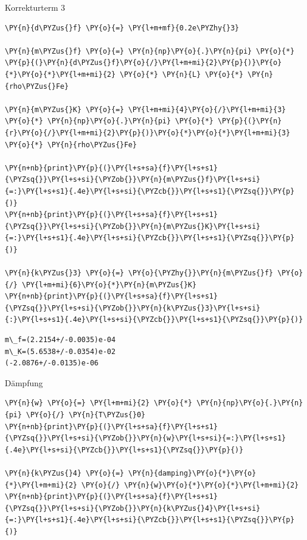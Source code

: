     Korrekturterm 3

    \begin{tcolorbox}[breakable, size=fbox, boxrule=1pt, pad at break*=1mm,colback=cellbackground, colframe=cellborder]
\begin{Verbatim}[commandchars=\\\{\}]
\PY{n}{d\PYZus{}f} \PY{o}{=} \PY{l+m+mf}{0.2e\PYZhy{}3}

\PY{n}{m\PYZus{}f} \PY{o}{=} \PY{n}{np}\PY{o}{.}\PY{n}{pi} \PY{o}{*} \PY{p}{(}\PY{n}{d\PYZus{}f}\PY{o}{/}\PY{l+m+mi}{2}\PY{p}{)}\PY{o}{*}\PY{o}{*}\PY{l+m+mi}{2} \PY{o}{*} \PY{n}{L} \PY{o}{*} \PY{n}{rho\PYZus{}Fe}

\PY{n}{m\PYZus{}K} \PY{o}{=} \PY{l+m+mi}{4}\PY{o}{/}\PY{l+m+mi}{3} \PY{o}{*} \PY{n}{np}\PY{o}{.}\PY{n}{pi} \PY{o}{*} \PY{p}{(}\PY{n}{r}\PY{o}{/}\PY{l+m+mi}{2}\PY{p}{)}\PY{o}{*}\PY{o}{*}\PY{l+m+mi}{3} \PY{o}{*} \PY{n}{rho\PYZus{}Fe}

\PY{n+nb}{print}\PY{p}{(}\PY{l+s+sa}{f}\PY{l+s+s1}{\PYZsq{}}\PY{l+s+si}{\PYZob{}}\PY{n}{m\PYZus{}f}\PY{l+s+si}{=:}\PY{l+s+s1}{.4e}\PY{l+s+si}{\PYZcb{}}\PY{l+s+s1}{\PYZsq{}}\PY{p}{)}
\PY{n+nb}{print}\PY{p}{(}\PY{l+s+sa}{f}\PY{l+s+s1}{\PYZsq{}}\PY{l+s+si}{\PYZob{}}\PY{n}{m\PYZus{}K}\PY{l+s+si}{=:}\PY{l+s+s1}{.4e}\PY{l+s+si}{\PYZcb{}}\PY{l+s+s1}{\PYZsq{}}\PY{p}{)}

\PY{n}{k\PYZus{}3} \PY{o}{=} \PY{o}{\PYZhy{}}\PY{n}{m\PYZus{}f} \PY{o}{/} \PY{l+m+mi}{6}\PY{o}{*}\PY{n}{m\PYZus{}K}
\PY{n+nb}{print}\PY{p}{(}\PY{l+s+sa}{f}\PY{l+s+s1}{\PYZsq{}}\PY{l+s+si}{\PYZob{}}\PY{n}{k\PYZus{}3}\PY{l+s+si}{:}\PY{l+s+s1}{.4e}\PY{l+s+si}{\PYZcb{}}\PY{l+s+s1}{\PYZsq{}}\PY{p}{)}
\end{Verbatim}
\end{tcolorbox}

    \begin{Verbatim}[commandchars=\\\{\}]
m\_f=(2.2154+/-0.0035)e-04
m\_K=(5.6538+/-0.0354)e-02
(-2.0876+/-0.0135)e-06
    \end{Verbatim}

    Dämpfung

    \begin{tcolorbox}[breakable, size=fbox, boxrule=1pt, pad at break*=1mm,colback=cellbackground, colframe=cellborder]
\begin{Verbatim}[commandchars=\\\{\}]
\PY{n}{w} \PY{o}{=} \PY{l+m+mi}{2} \PY{o}{*} \PY{n}{np}\PY{o}{.}\PY{n}{pi} \PY{o}{/} \PY{n}{T\PYZus{}0}
\PY{n+nb}{print}\PY{p}{(}\PY{l+s+sa}{f}\PY{l+s+s1}{\PYZsq{}}\PY{l+s+si}{\PYZob{}}\PY{n}{w}\PY{l+s+si}{=:}\PY{l+s+s1}{.4e}\PY{l+s+si}{\PYZcb{}}\PY{l+s+s1}{\PYZsq{}}\PY{p}{)}

\PY{n}{k\PYZus{}4} \PY{o}{=} \PY{n}{damping}\PY{o}{*}\PY{o}{*}\PY{l+m+mi}{2} \PY{o}{/} \PY{n}{w}\PY{o}{*}\PY{o}{*}\PY{l+m+mi}{2}
\PY{n+nb}{print}\PY{p}{(}\PY{l+s+sa}{f}\PY{l+s+s1}{\PYZsq{}}\PY{l+s+si}{\PYZob{}}\PY{n}{k\PYZus{}4}\PY{l+s+si}{=:}\PY{l+s+s1}{.4e}\PY{l+s+si}{\PYZcb{}}\PY{l+s+s1}{\PYZsq{}}\PY{p}{)}
\end{Verbatim}
\end{tcolorbox}

